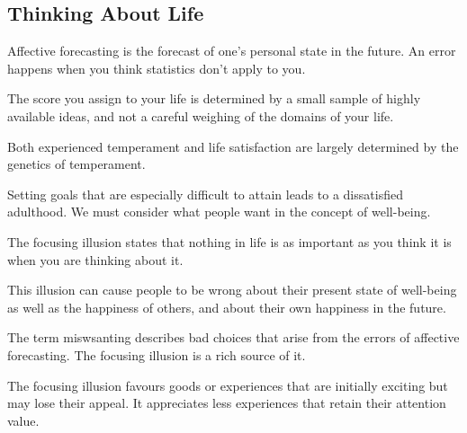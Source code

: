 \subsection*{Thinking About Life}

\bit
\item Affective forecasting is the forecast of one's personal state in the future. An error happens when you think
statistics don't apply to you.
\item The score you assign to your life is determined by a small sample of highly available ideas, and not a careful
weighing of the domains of your life.
\item Both experienced temperament and life satisfaction are largely determined by the genetics of temperament.
\item Setting goals that are especially difficult to attain leads to a dissatisfied adulthood. We must consider what
people want in the concept of well-being.
\item The focusing illusion states that nothing in life is as important as you think it is when you are thinking
about it.
\item This illusion can cause people to be wrong about their present state of well-being as well as the happiness of
others, and about their own happiness in the future.
\item The term miswsanting describes bad choices that arise from the errors of affective forecasting. The focusing
illusion is a rich source of it.
\item The focusing illusion favours goods or experiences that are initially exciting but may lose their appeal. It
appreciates less experiences that retain their attention value.
\eit